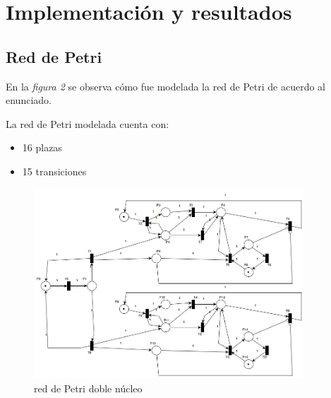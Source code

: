 \documentclass{article}
\begin{document}
    \section{Implementación y resultados}
    \subsection{Red de Petri}
    \begin{flushleft}
        En la \emph{figura 2} se observa cómo fue modelada la red de Petri de acuerdo al enunciado. \par
        La red de Petri modelada cuenta con:
    \end{flushleft}
    \begin{itemize}
        \item 16 plazas
        \item 15 transiciones
    \end{itemize}
    \begin{figure}[t]
        \includegraphics[width=0.9\textwidth, center]{rdp.png}
        \caption{red de Petri doble núcleo}
    \end{figure}   
\end{document}
